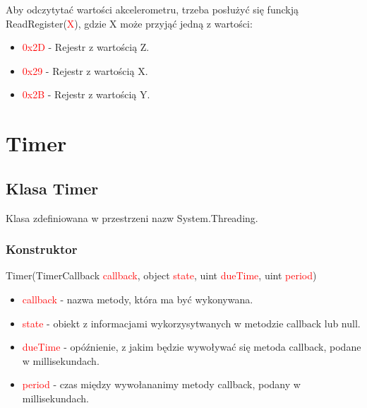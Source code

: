 \documentclass{article}
\begin{document}
Aby odczytytać wartości akcelerometru, trzeba posłużyć się funckją \\ReadRegister(\textcolor{red}{X}), gdzie X może przyjąć jedną z wartości:
\begin{itemize}
\item \textcolor{red}{0x2D } - Rejestr z wartością Z.
\item \textcolor{red}{ 0x29 } - Rejestr z wartością X.
\item \textcolor{red}{ 0x2B } - Rejestr z wartością Y.
\end{itemize}

\section{Timer}
\subsection{Klasa Timer}
Klasa zdefiniowana w przestrzeni nazw System.Threading.
\subsubsection{Konstruktor}
Timer(TimerCallback \textcolor{red}{callback}, object \textcolor{red}{state}, uint \textcolor{red}{dueTime}, uint \textcolor{red}{period})
\begin{itemize}
\item \textcolor{red}{callback} - nazwa metody, która ma być wykonywana.
\item \textcolor{red}{state} - obiekt z informacjami wykorzysytwanych w metodzie callback lub null.
\item \textcolor{red}{dueTime} - opóźnienie, z jakim będzie wywoływać się metoda callback, podane w millisekundach.
\item \textcolor{red}{period} - czas między wywołananimy metody callback, podany w millisekundach.
\end{itemize}
\end{document}
